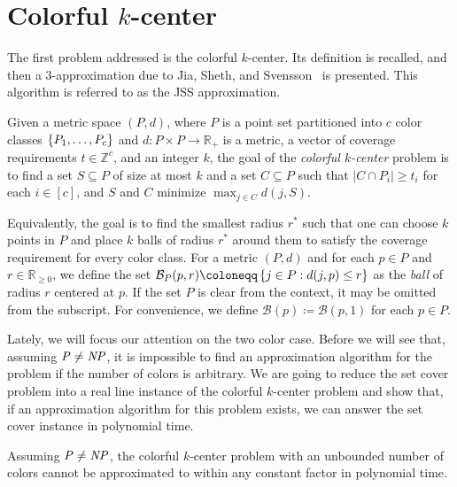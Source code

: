 \chapter{Colorful $k$-center}
\label{cap:colkcenter}
The first problem addressed is the colorful $k$-center. 
Its definition is recalled, and then a 3-approximation due to Jia, Sheth, and Svensson~\cite{JSS2020} is presented. This algorithm is referred to as the JSS approximation.

\begin{problem}
Given a metric space $(P,d)$, where $P$ is a point set partitioned into $c$ color classes $\left\{P_1,\ldots,P_c\right\}$ and $d : P \times P \to \mathbb{R}_+$ is a metric, a vector of coverage requirements $t \in \mathbb{Z}^c$, and an integer $k$,
the goal of the \emph{colorful $k$-center} problem is to find a set $S \subseteq P$ of size at most $k$ and a set $C \subseteq P$ such that $|C \cap P_i| \geq t_i$ for each $i \in [c]$, and $S$ and $C$ minimize $\max_{j \in C} d(j,S)$.
\end{problem}
Equivalently, the goal is to find the smallest radius $r^*$ such that one can choose $k$ points in $P$ and place $k$ balls of radius $r^*$ around them to satisfy the coverage requirement for every color class. For a metric $(P,d)$ and for each $p \in P$ and $r \in \mathbb{R}_{\geq 0}$, we define the set $\mathcal{B}_P(p,r) \coloneqq \set{j \in P : d(j,p) \leq r}$ as the \emph{ball} of radius $r$ centered at $p$. If the set $P$ is clear from the context, it may be omitted from the subscript. For convenience, we define $\mathcal{B}(p) \coloneqq \mathcal{B}(p,1)$ for each $p \in P$.

Lately, we will focus our attention on the two color case. Before we will see that, assuming $\mathit{P} \neq \mathit{NP}$, it is impossible to find an approximation algorithm for the problem if the number of colors is arbitrary. We are going to reduce the set cover problem into a real line instance of the colorful $k$-center problem and show that, if an approximation algorithm for this problem exists, we can answer the set cover instance in polynomial time.

\begin{theorem}
    Assuming $\mathit{P} \neq \mathit{NP}$, the colorful $k$-center problem with an unbounded number of colors cannot be approximated to within any constant factor in polynomial time.
\end{theorem}

